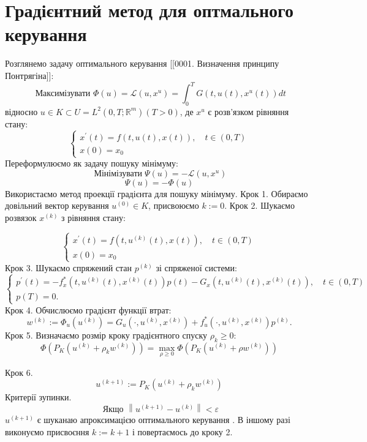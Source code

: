 \documentclass[a4paper,12pt]{extreport}
\begin{document}
\section{Градієнтний метод для оптмального керування}

Розглянемо задачу оптимального керування [[0001. Визначення принципу Понтрягіна]]:
$$
\text { Максимізувати } \Phi(u)=\mathcal{L}\left(u, x^u\right)=\int_0^T G\left(t, u(t), x^u(t)\right) d t
$$
відносно $u \in K \subset U=L^2\left(0, T ; \mathbb{R}^m\right)(T>0)$, де $x^u$ є розв'язком рівняння стану:
$$
\left\{\begin{array}{l}
x^{\prime}(t)=f(t, u(t), x(t)), \quad t \in(0, T) \\
x(0)=x_0
\end{array}\right.
$$
    Переформулюємо як задачу пошуку мінімуму:
$$
    \operatorname{Мінімізувати} \Psi(u)=-\mathcal{L}\left(u, x^u\right)
$$
$$
    \Psi(u)=-\Phi(u)
$$
    Використаємо метод проекції градієнта для пошуку мінімуму.
    Крок 1. Обираємо довільний вектор керування $u^{(0)} \in K$, присвоюємо $k:=0$.
    Крок 2. Шукаємо розвязок $x^{(k)}$ з рівняння стану:

$$
    \left\{\begin{array}{l}
        x^{\prime}(t)=f\left(t, u^{(k)}(t), x(t)\right), \quad t \in(0, T) \\
        x(0)=x_0
    \end{array}\right.
$$
    Крок 3. Шукаємо спряжений стан $p^{(k)}$ зі спряженої системи:
$$
    \left\{\begin{array}{l}
        p^{\prime}(t)=-f_x^*\left(t, u^{(k)}(t), x^{(k)}(t)\right) p(t)-G_x\left(t, u^{(k)}(t), x^{(k)}(t)\right), \quad t \in(0, T) \\
        p(T)=0 .
    \end{array}\right.
$$
    Крок 4. Обчислюємо градієнт функції втрат:
$$
    w^{(k)}:=\Phi_u\left(u^{(k)}\right)=G_u\left(\cdot, u^{(k)}, x^{(k)}\right)+f_u^*\left(\cdot, u^{(k)}, x^{(k)}\right) p^{(k)} .
$$
    Крок 5. Визначаємо розмір кроку градієнтного спуску $\rho_k \geq 0$:
$$
    \Phi\left(P_K\left(u^{(k)}+\rho_k w^{(k)}\right)\right)=\max _{\rho \geq 0} \Phi\left(P_K\left(u^{(k)}+\rho w^{(k)}\right)\right)
$$

Крок 6. 
$$
    u^{(k+1)}:=P_K\left(u^{(k)}+\rho_k w^{(k)}\right)
$$
Критерії зупинки.
$$
    \text { Якщо }\left\|u^{(k+1)}-u^{(k)}\right\|<\varepsilon
$$
$u^{(k+1)} \text { є шуканаю апроксимацією оптимального керування }$. В іншому разі виконуємо присвоєння $k:=k+1$ і повертаємось до кроку 2.
\end{document}
